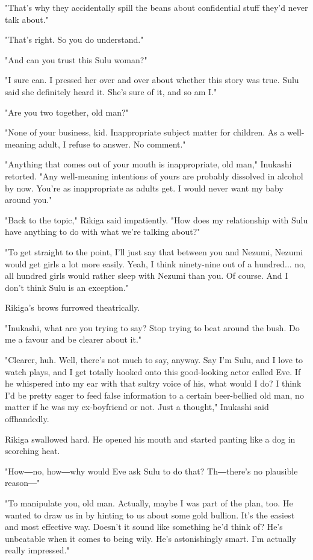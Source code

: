 "That's why they accidentally spill the beans about confidential stuff
they'd never talk about."

"That's right. So you do understand."

"And can you trust this Sulu woman?"

"I sure can. I pressed her over and over about whether this story was
true. Sulu said she definitely heard it. She's sure of it, and so am I."

"Are you two together, old man?"

"None of your business, kid. Inappropriate subject matter for children.
As a well-meaning adult, I refuse to answer. No comment."

"Anything that comes out of your mouth is inappropriate, old man,"
Inukashi retorted. "Any well-meaning intentions of yours are probably
dissolved in alcohol by now. You're as inappropriate as adults get. I
would never want my baby around you."

"Back to the topic," Rikiga said impatiently. "How does my relationship
with Sulu have anything to do with what we're talking about?"

"To get straight to the point, I'll just say that between you and
Nezumi, Nezumi would get girls a lot more easily. Yeah, I think
ninety-nine out of a hundred... no, all hundred girls would rather sleep
with Nezumi than you. Of course. And I don't think Sulu is an
exception."

Rikiga's brows furrowed theatrically.

"Inukashi, what are you trying to say? Stop trying to beat around the
bush. Do me a favour and be clearer about it."

"Clearer, huh. Well, there's not much to say, anyway. Say I'm Sulu, and
I love to watch plays, and I get totally hooked onto this good-looking
actor called Eve. If he whispered into my ear with that sultry voice of
his, what would I do? I think I'd be pretty eager to feed false
information to a certain beer-bellied old man, no matter if he was my
ex-boyfriend or not. Just a thought," Inukashi said offhandedly.

Rikiga swallowed hard. He opened his mouth and started panting like a
dog in scorching heat.

"How―no, how―why would Eve ask Sulu to do that? Th―there's no plausible
reason―"

"To manipulate you, old man. Actually, maybe I was part of the plan,
too. He wanted to draw us in by hinting to us about some gold bullion.
It's the easiest and most effective way. Doesn't it sound like something
he'd think of? He's unbeatable when it comes to being wily. He's
astonishingly smart. I'm actually really impressed."

